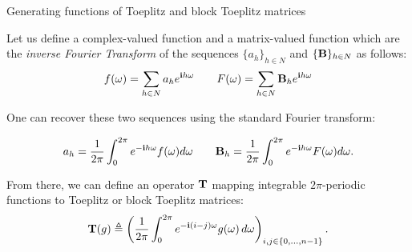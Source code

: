 \begin{frame}{Generating functions of Toeplitz and block Toeplitz matrices}


  Let us define a complex-valued function and a matrix-valued function which are the \emph{inverse Fourier Transform} of the sequences $\{a_h\}_{h \in N}$ and $\{\mathbf{B}\}_{h \in N}$ as follows:
  \begin{equation*}
    f(\omega) = \sum_{h \in N} a_h e^{\mathbf{i} h \omega} \quad \quad F(\omega) = \sum_{h \in N} \mathbf{B}_h e^{\mathbf{i} h \omega} 
  \end{equation*}

  One can recover these two sequences using the standard Fourier transform:

  \begin{equation*}
    a_h = \frac{1}{2\pi} \int_0^{2\pi} e^{-\mathbf{i} h \omega} f(\omega) d\omega \quad \quad \mathbf{B}_h = \frac{1}{2\pi} \int_0^{2\pi} e^{-\mathbf{i} h \omega} F(\omega) d\omega .
  \end{equation*}

  From there, we can define an operator $\mathbf{T}$ mapping integrable $2\pi$-periodic functions to Toeplitz or block Toeplitz matrices:
  \begin{equation*}
    \mathbf{T}(g) \triangleq\left(\frac{1}{2\pi}\int_{0}^{2\pi}e^{-\mathbf{i}(i-j)\omega}g(\omega)\,d\omega\right)_{i,j\in\{0,\ldots,n-1\}} . 
  \end{equation*}


\end{frame}



